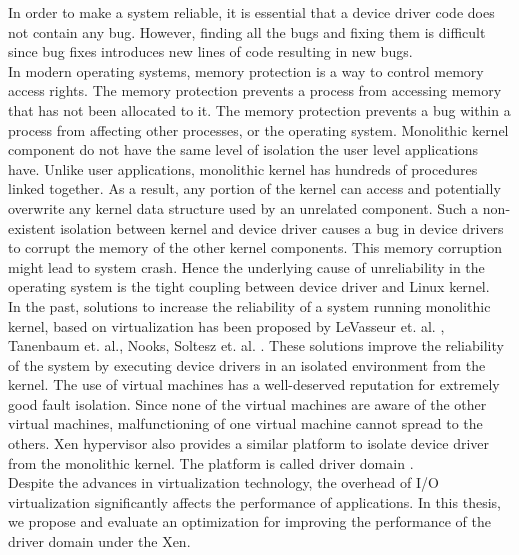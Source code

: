 In order to make a system reliable, it is essential that a device driver code does not contain any bug. However, finding all the bugs and fixing them is difficult since bug fixes introduces new lines of code resulting in new bugs. 
\\
In modern operating systems, memory protection is a way to control memory access rights. The memory protection prevents a process from accessing memory that has not been allocated to it. The memory protection prevents a bug within a process from affecting other processes, or the operating system\cite{Denning:1970:VM:356571.356573, Galvin}. Monolithic kernel component do not have the same level of isolation the user level applications have. Unlike user applications, monolithic kernel has hundreds of procedures linked together. As a result, any portion of the kernel can access and potentially overwrite any kernel data structure used by an unrelated component. Such a non-existent isolation between kernel and device driver causes a bug in device drivers to corrupt the memory of the other kernel components. This memory corruption might lead to system crash. Hence the underlying cause of unreliability in the operating system is the tight coupling between device driver and Linux kernel.
\\
In the past, solutions to increase the reliability of a system running monolithic kernel, based on virtualization has been proposed by LeVasseur et. al. \cite{LeVasseur04UnmodifiedDriverReuse}, Tanenbaum et. al.\cite{Tanenbaum06canwe}, Nooks\cite{Swift:2002:NAR:1133373.1133393}, Soltesz et. al. \cite{Soltesz:2007:COS:1272998.1273025}. These solutions improve the reliability of the system by executing device drivers in an isolated environment from the kernel. The use of virtual machines has a well-deserved reputation for extremely good fault isolation. Since none of the virtual machines are aware of the other virtual machines, malfunctioning of one virtual machine cannot spread to the others. Xen hypervisor also provides a similar platform to isolate device driver from the monolithic kernel. The platform is called driver domain \cite{driverdomain}.
\\
Despite the advances in virtualization technology, the overhead of I/O virtualization significantly affects the performance of applications\cite{Barham:2003:XAV:945445.945462, Sugerman:2001:VID:647055.715774, Menon:2006:ONV:1267359.1267361}. In this thesis, we propose and evaluate an optimization for improving the performance of the driver domain under the Xen. 

